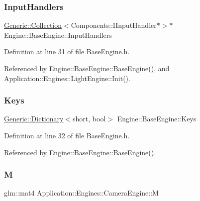 \subsubsection{\texorpdfstring{Input\+Handlers}{InputHandlers}}
{\footnotesize\ttfamily \mbox{\hyperlink{classGeneric_1_1Collection}{Generic\+::\+Collection}}$<$Components\+::\+I\+Input\+Handler$\ast$$>$$\ast$ Engine\+::\+Base\+Engine\+::\+Input\+Handlers\hspace{0.3cm}{\ttfamily [inherited]}}



Definition at line 31 of file Base\+Engine.\+h.



Referenced by Engine\+::\+Base\+Engine\+::\+Base\+Engine(), and Application\+::\+Engines\+::\+Light\+Engine\+::\+Init().

\mbox{\label{classEngine_1_1BaseEngine_a65321a97e83f0a6ee90df3efac2d3307}} 
\subsubsection{\texorpdfstring{Keys}{Keys}}
{\footnotesize\ttfamily \mbox{\hyperlink{classGeneric_1_1Dictionary}{Generic\+::\+Dictionary}}$<$short, bool$>$ Engine\+::\+Base\+Engine\+::\+Keys\hspace{0.3cm}{\ttfamily [inherited]}}



Definition at line 32 of file Base\+Engine.\+h.



Referenced by Engine\+::\+Base\+Engine\+::\+Base\+Engine().

\mbox{\label{classApplication_1_1Engines_1_1CameraEngine_a2c5eb2ee7aa78a335df64d77242fb21c}} 
\subsubsection{\texorpdfstring{M}{M}}
{\footnotesize\ttfamily glm\+::mat4 Application\+::\+Engines\+::\+Camera\+Engine\+::M\hspace{0.3cm}{\ttfamily [private]}}



